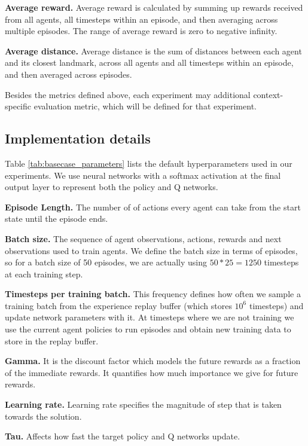 \documentclass{article}
\begin{document}
\textbf{Average reward.} Average reward is calculated by summing up rewards received from all agents, all timesteps within an episode, and then averaging across multiple episodes. The range of average reward is zero to negative infinity. 

\textbf{Average distance.} Average distance is the sum of distances between each agent and its closest landmark, across all agents and all timesteps within an episode, and then averaged across episodes.

Besides the metrics defined above, each experiment may additional context-specific evaluation metric, which will be defined for that experiment.


\subsection{Implementation details}

Table \ref{tab:basecase_parameters} lists the default hyperparameters used in our experiments. We use neural networks with a softmax activation at the final output layer to represent both the policy and Q networks.

\textbf{Episode Length.} The number of of actions every agent can take from the start state until the episode ends.

\textbf{Batch size.} The sequence of agent observations, actions, rewards and next observations used to train agents. We define the batch size in terms of episodes, so for a batch size of 50 episodes, we are actually using $50*25 = 1250$ timesteps at each training step.

\textbf{Timesteps per training batch.} This frequency defines how often we sample a training batch from the experience replay buffer (which stores $10^6$ timesteps) and update network parameters with it. At timesteps where we are not training we use the current agent policies to run episodes and obtain new training data to store in the replay buffer.

\textbf{Gamma.} It is the discount factor which models the future rewards as a fraction of the immediate rewards. It quantifies how much importance we give for future rewards.

\textbf{Learning rate.} Learning rate specifies the magnitude of step that is taken towards the solution. 

\textbf{Tau.} Affects how fast the target policy and Q networks update. 
\end{document}
